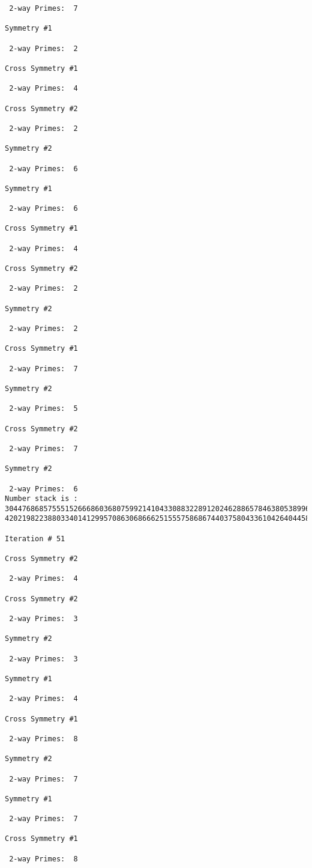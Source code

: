 {{{{\begin{verbatim}
 2-way Primes: 	7

Symmetry #1

 2-way Primes: 	2

Cross Symmetry #1

 2-way Primes: 	4

Cross Symmetry #2

 2-way Primes: 	2

Symmetry #2

 2-way Primes: 	6

Symmetry #1

 2-way Primes: 	6

Cross Symmetry #1

 2-way Primes: 	4

Cross Symmetry #2

 2-way Primes: 	2

Symmetry #2

 2-way Primes: 	2

Cross Symmetry #1

 2-way Primes: 	7

Symmetry #2

 2-way Primes: 	5

Cross Symmetry #2

 2-way Primes: 	7

Symmetry #2

 2-way Primes: 	6
Number stack is :
30447686857555152666860368075992141043308832289120246288657846380538996794608835958544046240163340857
42021982238803340141299570863068666251555758686744037580433610426404458595388064976998350836487568826

Iteration #	51

Cross Symmetry #2

 2-way Primes: 	4

Cross Symmetry #2

 2-way Primes: 	3

Symmetry #2

 2-way Primes: 	3

Symmetry #1

 2-way Primes: 	4

Cross Symmetry #1

 2-way Primes: 	8

Symmetry #2

 2-way Primes: 	7

Symmetry #1

 2-way Primes: 	7

Cross Symmetry #1

 2-way Primes: 	8


\end{verbatim}}}}}
